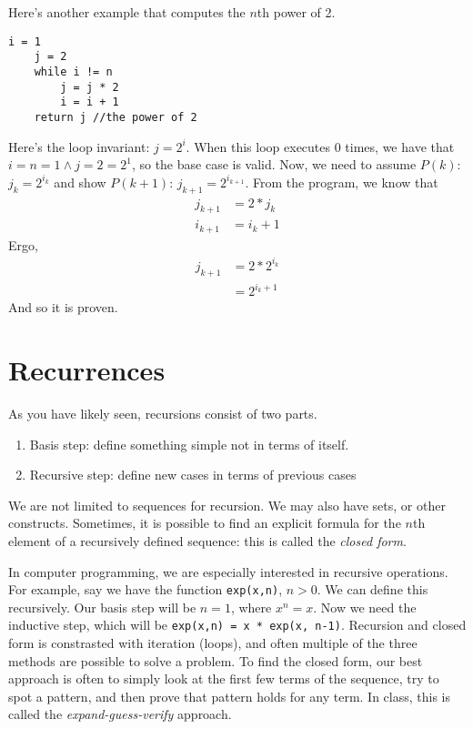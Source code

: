 \documentclass[nobib]{tufte-handout}
\begin{document}
Here's another example that computes the $n$th power of 2.
\begin{lstlisting}[caption=2**n]
    i = 1
    j = 2
    while i != n 
        j = j * 2
        i = i + 1
    return j //the power of 2
\end{lstlisting}
Here's the loop invariant: $j = 2^i$. When this loop executes 0 times, 
we have that $i=n=1 \land j=2=2^1$, so the base case is valid. 
Now, we need to assume $P(k)$: $j_k=2^{i_k}$ and show 
$P(k+1)$: $j_{k+1} = 2^{i_{k+1}}$. 
From the program, we know that 
\begin{align*}
    j_{k+1} &= 2*j_k \\
    i_{k+1} &= i_k + 1
\end{align*}
Ergo, 
\begin{align*}
    j_{k+1} &= 2 * 2^{i_k} \\
    &= 2^{i_k+1} 
\end{align*}
And so it is proven. 

\section{Recurrences}

As you have likely seen, recursions consist of two parts. 
\begin{enumerate}
    \item Basis step: define something simple not in terms of itself. 
    \item Recursive step: define new cases in terms of previous cases
\end{enumerate}
We are not limited to sequences for recursion. We may also have sets, 
or other constructs. Sometimes, it is possible to find 
an explicit formula for the $n$th element of a recursively defined 
sequence: this is called the \emph{closed form}. 

In computer programming, we are especially interested in recursive operations. 
For example, say we have the function \texttt{exp(x,n)}, $n > 0$. We can define this recursively. 
Our basis step will be $n=1$, where $x^n = x$. Now we need the inductive step, which will be
\texttt{exp(x,n) = x * exp(x, n-1)}. Recursion and closed form is constrasted with iteration (loops), 
and often multiple of the three methods are possible to solve a problem. 
To find the closed form, our best approach is often to simply look at the first few terms of the 
sequence, try to spot a pattern, and then prove that pattern holds for any term. In class, 
this is called the \emph{expand-guess-verify} approach. 
\end{document}
